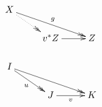 \documentclass{standalone}
\begin{document}
\pagecolor{white}
\(
\xymatrix@R=17pt{
 X \ar@{->>}[drr]^-{g} \ar@{.>>}[dr] &  &  \\
  & v^{*}Z \ar[r] & Z \\
 I \ar@{->>}[dr]_-{u} \ar@{->>}[drr] &  &  \\
  & J \ar[r]_-{v} & K
}
\)
\end{document}
